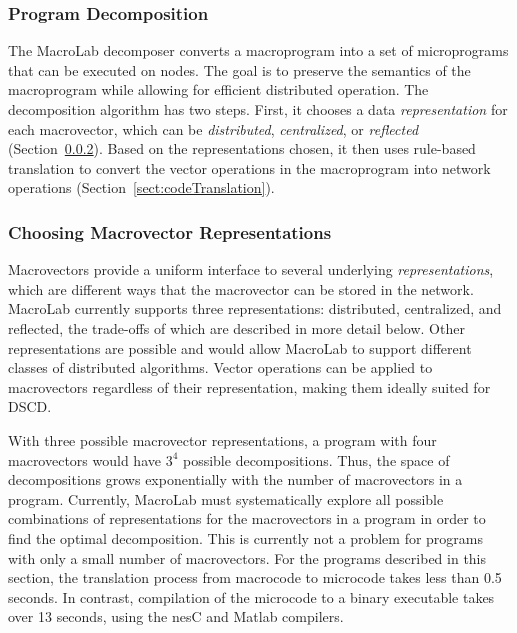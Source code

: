 \subsubsection{Program Decomposition} \label{sect:decomposer}

The MacroLab decomposer converts a macroprogram into a set of microprograms that
can be executed on nodes.  The goal is to preserve the semantics of the
macroprogram while allowing for efficient distributed operation.  The
decomposition algorithm has two steps. First, it chooses a data {\em
representation} for each macrovector, which can be {\em distributed}, {\em
centralized}, or {\em reflected} (Section~\ref{sect:decompositionTypes}).  Based
on the representations chosen, it then uses rule-based translation to convert
the vector operations in the macroprogram into network operations
(Section~\ref{sect:codeTranslation}).

\subsubsection{Choosing Macrovector Representations}\label{sect:decompositionTypes}

Macrovectors provide a uniform interface to several underlying {\em
representations}, which are different ways that the macrovector can be stored in
the network.  MacroLab currently supports three representations: distributed,
centralized, and reflected, the trade-offs of which are described in more detail
below.  Other representations are possible and would allow MacroLab to support
different classes of distributed algorithms.  Vector operations can be applied
to macrovectors regardless of their representation, making them ideally suited
for DSCD.

With three possible macrovector representations, a program with four
macrovectors would have $3^4$ possible decompositions.  Thus, the space of
decompositions grows exponentially with the number of macrovectors in a program.
Currently, MacroLab must systematically explore all possible combinations of
representations for the macrovectors in a program in order to find the optimal
decomposition.  This is currently not a problem for programs with only a small
number of macrovectors. For the programs described in this section, the
translation process from macrocode to microcode takes less than 0.5 seconds.  In
contrast, compilation of the microcode to a binary executable takes over 13
seconds, using the nesC and Matlab compilers.

